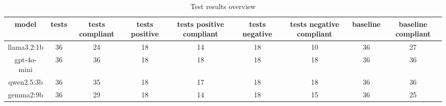 
  \begin{table}[h!]
  \centering
  \begin{tabular}{|c|c|c|c|c|c|c|c|c|}
  \hline
  model & tests & tests compliant & tests positive & tests positive compliant & tests negative & tests negative compliant & baseline & baseline compliant \\
  \hline
  llama3.2:1b & 36 & 24 & 18 & 14 & 18 & 10 & 36 & 27\\
\hline
gpt-4o-mini & 36 & 36 & 18 & 18 & 18 & 18 & 36 & 36\\
\hline
qwen2.5:3b & 36 & 35 & 18 & 17 & 18 & 18 & 36 & 36\\
\hline
gemma2:9b & 36 & 29 & 18 & 14 & 18 & 15 & 36 & 25
  \end{tabular}
  \caption{Test results overview}
  
  \end{table}
  